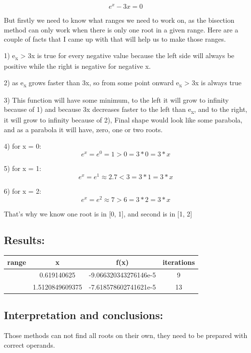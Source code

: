 \documentclass{article}
\begin{document}
\[
    e^x - 3x = 0
\]

But firstly we need to know what ranges we need to work on, as the bisection method can only work when there is only one root in a given range. Here are a couple of facts that I came up with that will help us to make those ranges.

1) e\textsubscript{x} > 3x is true for every negative value because the left side will always be positive while the right is negative for negative x.

2) as e\textsubscript{x} grows faster than 3x, so from some point onward e\textsubscript{x} > 3x is always true

3) This function will have some minimum, to the left it will grow to infinity because of 1) and because 3x decreases faster to the left than e\textsubscript{x}, and to the right, it will grow to infinity because of 2), Final shape would look like some parabola, and as a parabola it will have, zero, one or two roots.

4) for x = 0:
\[
    e^x = e^0 = 1 > 0 = 3*0 = 3*x
\]

5) for x = 1:
\[
    e^x = e^1 \approx 2.7 < 3 = 3*1 = 3*x
\]

6) for x = 2:
\[
    e^x = e^2 \approx 7 > 6 = 3*2 = 3*x
\]

That's why we know one root is in [0, 1], and second is in [1, 2]

\subsection*{Results:}
\begin{center}
    \begin{tabular}{| c | c | c | c |}
        \hline
        range & x & f(x) & iterations \\ 
        \hline
        \hline
        [0, 1] & 0.619140625 & -9.066320343276146e-5 & 9\\
        \hline
        [1, 2] & 1.5120849609375 & -7.618578602741621e-5 & 13\\
        \hline
    \end{tabular}
\end{center}

\subsection*{Interpretation and conclusions:}
Those methods can not find all roots on their own, they need to be prepared with correct operands.
\end{document}
